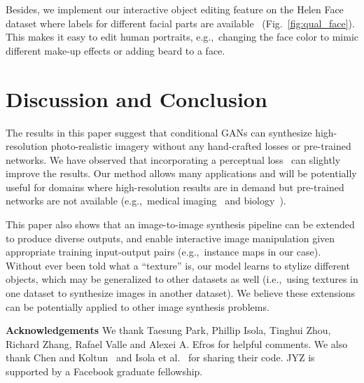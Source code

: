 Besides, we implement our interactive object editing feature on the Helen Face dataset where labels for different facial parts are available~\cite{smith2013exemplar} (Fig.~\ref{fig:qual_face}).
This makes it easy to edit human portraits, e.g.,\ changing the face color to mimic different make-up effects or adding beard to a face.

\section{Discussion and Conclusion} \label{sec:conclusion}

The results in this paper suggest that conditional GANs can synthesize high-resolution photo-realistic imagery without any hand-crafted losses or pre-trained networks. We have observed that incorporating a perceptual loss~\cite{johnson2016perceptual} can slightly improve the results. Our method allows many applications and will be potentially useful for domains where high-resolution results are in demand but pre-trained networks are not available (e.g.,\ medical imaging~\cite{guibas2017synthetic} and biology~\cite{costa2017end}).

This paper also shows that an image-to-image synthesis pipeline can be extended to produce diverse outputs, and enable interactive image manipulation given appropriate training input-output pairs (e.g.,\ instance maps in our case). Without ever been told what a ``texture'' is, our model learns to stylize different objects, which may be generalized to other datasets as well (i.e.,\ using textures in one dataset to synthesize images in another dataset). We believe these extensions  can be potentially applied to other image synthesis problems. 

{ \bf Acknowledgements} We thank Taesung Park, Phillip Isola, Tinghui Zhou, Richard Zhang, Rafael Valle and Alexei A. Efros for helpful comments. We also thank Chen and Koltun~\cite{chen2017photographic} and Isola et al.~\cite{isola2016image} for sharing their code. JYZ is supported by a Facebook graduate fellowship.

{\thispagestyle{empty}\cleardoublepage}


